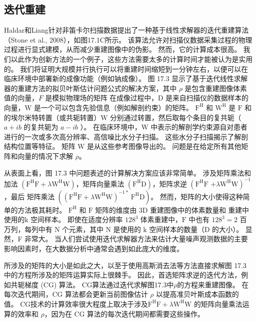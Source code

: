 \subsection{迭代重建}
Haldar和Liang针对非笛卡尔扫描数据提出了一种基于线性求解器的迭代重建算法（Stone et al., 2008），如图17.1C所示。 该算法允许对扫描仪数据采集过程的物理过程进行显式建模，从而减少重建图像中的伪影。 然而，它的计算成本很高。 我们以此作为创新方法的一个例子，这些方法需要太多的计算时间才能被认为是实用的。 我们将证明大规模并行执行可以将重建时间缩短到一分钟左右，以便可以在临床环境中部署新的成像功能（例如钠成像）。 图 17.3 显示了基于迭代线性求解器的重建方法的拟贝叶斯估计问题公式的解决方案，其中 $\rho$ 是包含重建图像体素值的向量，$F$ 是模拟物理场的矩阵 在成像过程中，D 是来自扫描仪的数据样本的向量，$\mathrm{W}$ 是一个可以包含先验信息（例如解剖约束）的矩阵。 $\mathrm{F}^{\mathrm{H}}$ 和 $\mathrm{W}^{\mathrm{H}}$ 是 $\mathrm{F}$ 和 $ 的埃尔米特转置（或共轭转置） \mathrm{W}$ 分别通过转置，然后取每个条目的复共轭（$a+i b$ 的复共轭为 $a-i b$ ）。 在临床环境中，$\mathrm{W}$ 中表示的解剖学约束源自对患者进行的一次或多次高分辨率、高信噪比水分子扫描。 这些水分子扫描揭示了解剖结构位置等特征。 矩阵 $\mathrm{W}$ 是从这些参考图像导出的。 问题是在给定所有其他矩阵和向量的情况下求解 $\rho$。

从表面上看，图 17.3 中问题表述的计算解决方案应该非常简单。 涉及矩阵乘法和加法 $\left(\mathrm{F}^{\mathrm{H}} \mathrm{F}+\lambda \mathrm{W}^{\mathrm{H}} \mathrm{W}\right)$，矩阵向量乘法 $\left(\mathrm{F}^{\mathrm{H}} \mathrm{D}\right)$，矩阵求逆 $\left(\mathrm{F}^{\mathrm {H}} \mathrm{F}\right.$ $\left.+\lambda \mathrm{W}^{\mathrm{H}} \mathrm{W}\right)^{-1}$，最后 矩阵乘法 $\left(\left(\mathrm{F}^{\mathrm{H}} \mathrm{F}+\lambda \mathrm{W}^{\mathrm{H}} \mathrm{W}\right )^{-1 *} \mathrm{~F}^{\mathrm{H}} \mathrm{D}\right)$。 然而，矩阵的大小使得这种简单的方法极其耗时。 $\mathrm{F}^{\mathrm{H}}$ 和 $\mathrm{F}$ 矩阵的维度由 $3 \mathrm{D}$ 重建图像中的体素数量和 重建中使用的$\mathrm{k}$ 空间样本。 即使在适度分辨率 $128^{3}$ 体素重建中，$\mathrm{F}$ 中也有 $128^{3}=2$ 百万列，每列中有 $\mathrm{N}$ 个元素，其中 $ \mathrm{N}$ 是使用的 $\mathrm{k}$ 空间样本的数量（D 的大小）。 显然，F 非常大。 当人们尝试使用迭代求解器方法来估计大量噪声观测数据的主要影响因素时，在大数据分析中通常会遇到如此庞大的维度。

所涉及的矩阵的大小是如此之大，以至于使用高斯消去法等方法直接求解图 17.3 中的方程所涉及的矩阵运算实际上很棘手。 因此，首选矩阵求逆的迭代方法，例如共轭梯度 (CG) 算法。 CG算法通过迭代求解图17.3中$\rho$的方程来重建图像。 在每次迭代期间，CG 算法都会更新当前图像估计 $\rho$ 以提高准贝叶斯成本函数的值。 CG技术的计算效率很大程度上取决于涉及$\mathrm{F}^{\mathrm{H}} \mathrm{F}+\lambda \mathrm{W}^{\mathrm{H}} \mathrm{W}$ 的矩阵向量乘法运算的效率和 $\rho$，因为在 $\mathrm{CG}$ 算法的每次迭代期间都需要这些操作。

